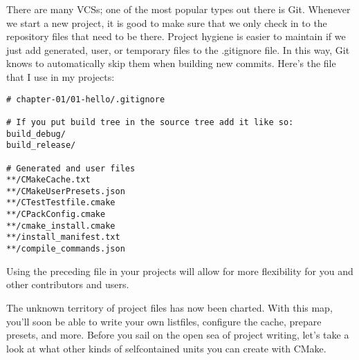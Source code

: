 There are many VCSs; one of the most popular types out there is Git. Whenever we start a new project, it is good to make sure that we only check in to the repository files that need to be there. Project hygiene is easier to maintain if we just add generated, user, or temporary files to the .gitignore file. In this way, Git knows to automatically skip them when building new commits. Here's the file that I use in my projects:

\begin{lstlisting}[style=styleCMake]	
# chapter-01/01-hello/.gitignore
	
# If you put build tree in the source tree add it like so:
build_debug/
build_release/

# Generated and user files
**/CMakeCache.txt
**/CMakeUserPresets.json
**/CTestTestfile.cmake
**/CPackConfig.cmake
**/cmake_install.cmake
**/install_manifest.txt
**/compile_commands.json
\end{lstlisting}

Using the preceding file in your projects will allow for more flexibility for you and other contributors and users.

The unknown territory of project files has now been charted. With this map, you'll soon be able to write your own listfiles, configure the cache, prepare presets, and more. Before you sail on the open sea of project writing, let's take a look at what other kinds of selfcontained units you can create with CMake.









